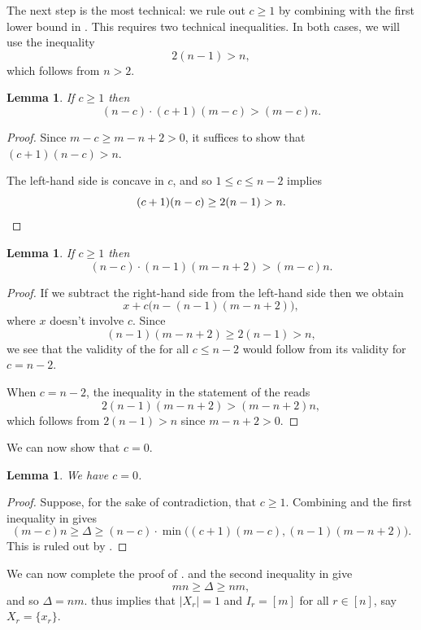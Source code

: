 \documentclass{article}
\newtheorem{lemma}[theorem]{Lemma}
\theoremstyle{definition}
\theoremstyle{remark}
\begin{document}
The next step is the most technical: we rule out $c \ge 1$ by combining  with the first lower bound in . This requires two technical inequalities. In both cases, we will use the inequality
\[
 2(n - 1) > n,
\]
which follows from $n > 2$.

\begin{lemma}
\label{lem:c=0-aux1}
If $c \ge 1$ then
\[
 (n-c) \cdot (c+1)(m-c) > (m-c) n.
\]
\end{lemma}
\begin{proof}
Since $m-c \ge m-n+2 > 0$, it suffices to show that $(c+1)(n-c) > n$.

The left-hand side is concave in $c$, and so $1 \leq c \leq n-2$ implies
\[
 (c+1)(n-c) \ge 2(n-1) > n. \qedhere
\]
\end{proof}

\begin{lemma}
\label{lem:c=0-aux2}
If $c \ge 1$ then
\[
 (n-c) \cdot (n-1)(m-n+2) > (m-c) n.
\]
\end{lemma}
\begin{proof}
If we subtract the right-hand side from the left-hand side then we obtain
\[
 x + c \bigl(n - (n-1)(m-n+2)\bigr),
\]
where $x$ doesn't involve $c$. Since
\[
 (n-1)(m-n+2) \ge 2(n-1) > n,
\]
we see that the validity of the  for all $c \leq n-2$ would follow from its validity for $c = n-2$.

When $c = n-2$, the inequality in the statement of the  reads
\[
 2(n-1)(m-n+2) > (m-n+2)n,
\]
which follows from $2(n-1) > n$ since $m-n+2 > 0$.
\end{proof}

We can now show that $c = 0$.

\begin{lemma}
\label{lem:c=0}
We have $c = 0$.
\end{lemma}
\begin{proof}
Suppose, for the sake of contradiction, that $c \ge 1$. Combining  and the first inequality in  gives
\[
 (m-c)n \ge \Delta \ge (n-c) \cdot \min\bigl((c+1)(m-c), (n-1)(m-n+2)\bigr).
\]
This is ruled out by .
\end{proof}

We can now complete the proof of .  and the second inequality in  give
\[
 mn \ge \Delta \ge nm,
\]
and so $\Delta = nm$.  thus implies that $|X_r| = 1$ and $I_r = [m]$ for all $r \in [n]$, say $X_r = \{x_r\}$.
\end{document}
